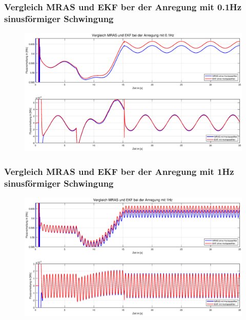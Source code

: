 \documentclass[serif,11pt, xcolor=table]{beamer}
\begin{document}
\begin{frame}
	\frametitle{Vergleich MRAS und EKF ber der Anregung mit 0.1Hz sinusförmiger Schwingung}
	 
	\begin{figure}[htbp]
		\centering
		\includegraphics[scale=0.30]{Abbildungen/Vergleich_01Hz.eps}
		
	\end{figure}	
	
\end{frame}
\begin{frame}
	\frametitle{Vergleich MRAS und EKF ber der Anregung mit 1Hz sinusförmiger Schwingung }
	
	\begin{figure}[htbp]
		\centering
		\includegraphics[scale=0.30]{Abbildungen/Vergleich_1Hz.eps}
		
	\end{figure}	
	
\end{frame}
\end{document}
